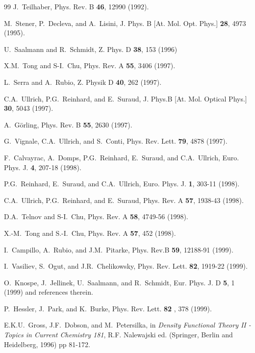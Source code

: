 \begin{thebibliography}{99}
 J.~Teilhaber, Phys. Rev. B {\bf 46}, 12990 (1992).

 M.~Stener, P.~Decleva, and A.~Lisini, J. Phys. B [At.
Mol. Opt. Phys.] {\bf 28}, 4973 (1995).

 U.~Saalmann and R.~Schmidt, Z. Phys. D {\bf 38}, 153
(1996)

 X.M.~Tong and S-I.~Chu, Phys. Rev. A {\bf 55}, 3406 (1997).

 L.~Serra and A.~Rubio, Z. Physik D {\bf 40}, 262 (1997).

 C.A.~Ullrich, P.G.~Reinhard, and E.~Suraud, J. Phys.B
[At. Mol. Optical Phys.] {\bf 30}, 5043 (1997).

 A.~G\"orling, Phys. Rev. B {\bf 55}, 2630 (1997).

 G.~Vignale, C.A.~Ullrich, and S.~Conti, Phys. Rev. Lett. 
{\bf 79}, 4878 (1997).

 F.~Calvayrac, A.~Domps, P.G.~Reinhard, E.~Suraud, and
C.A.~Ullrich, Euro. Phys. J. {\bf 4}, 207-18 (1998).

 P.G.~Reinhard, E.~Suraud, and C.A.~Ullrich, Euro. Phys.
J. {\bf 1}, 303-11 (1998).

 C.A.~Ullrich, P.G.~Reinhard, and E.~Suraud, Phys. Rev. A 
{\bf 57}, 1938-43 (1998).

 D.A.~Telnov and S-I.~Chu, Phys. Rev. A {\bf 58}, 4749-56
(1998).

 X.-M.~Tong and S.-I.~Chu, Phys. Rev. A {\bf 57}, 452 (1998).

 I.~Campillo, A.~Rubio, and J.M.~Pitarke, Phys. Rev.B 
{\bf 59}, 12188-91 (1999).

 I.~Vasiliev, S.~Ogut, and J.R.~Chelikowsky, Phys. Rev.
Lett. {\bf 82}, 1919-22 (1999).

 O.~Knospe, J.~Jellinek, U.~Saalmann, and R.~Schmidt, Eur.
Phys. J. D {\bf 5}, 1 (1999) and references therein.

 P.~Hessler, J.~Park, and K.~Burke, Phys. Rev. Lett. {\bf 82%
}, 378 (1999).

 E.K.U.~Gross, J.F.~Dobson, and M.~Petersilka, in {\it %
Density Functional Theory II - Topics in Current Chemistry 181}, R.F.
Nalewajski ed. (Springer, Berlin and Heidelberg, 1996) pp 81-172.


\end{thebibliography}
